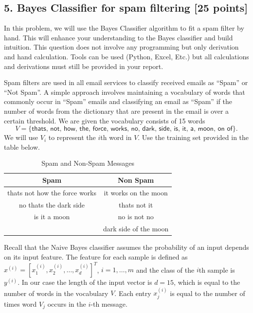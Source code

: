 \documentclass[12pt]{article}
\begin{document}


\subsection*{5. Bayes Classifier for spam filtering [25 points]} 

In this problem, we will use the  Bayes Classifier algorithm to fit a spam filter by hand. This will enhance your understanding to the Bayes classifier and build intuition. This question does not involve any programming but only derivation and hand calculation. Tools can be used (Python, Excel, Etc.) but all calculations and derivations must still be provided in your report.

Spam filters are used in all email services to classify received emails as ``Spam'' or ``Not Spam''. A simple approach involves maintaining a vocabulary of words that commonly occur in ``Spam'' emails and classifying an email as ``Spam'' if the number of words from the dictionary that are present in the email is over a certain threshold.
We are given the vocabulary consists of 15 words \[V=\{\textsf{thats, not, how, the, force, works, no, dark, side, is, it, a, moon, on of}\}.\] We will use $V_i$ to represent the $i$th word in $V$. Use the training set provided in the table below.

\begin{table}[H]
    \centering
    \begin{tabular}{|c|c|}
        \hline
        \textbf{Spam} & \textbf{Non Spam} \\
        \hline
        \textsf{thats not how the force works} & \textsf{it works on the moon} \\
        \hline
        \textsf{no thats the dark side} & \textsf{thats not it} \\
        \hline
        \textsf{is it a moon} & \textsf{no is not no} \\
        \hline
        & \textsf{dark side of the moon} \\
        \hline
    \end{tabular}
    \caption{Spam and Non-Spam Messages}
    \label{tab:sentiment_messages}
\end{table}

Recall that the Naive Bayes classifier assumes the probability of an input depends on its input feature. The feature for each sample is defined as
$x^{(i)} = [x_1^{(i)}, x_2^{(i)}, \ldots, x_d^{(i)}]^T$, $i = 1, \ldots, m$ and the class of the $i$th sample is $y^{(i)}$. In our case the length of the input vector is $d = 15$, which is equal to the number of words in the vocabulary $V$. Each entry $x_j^{(i)}$ is equal to the number of times word $V_j$ occurs in the $i$-th message. 
\end{document}
